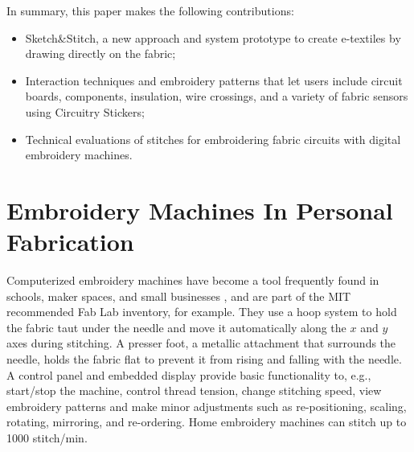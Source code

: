 \documentclass[header.tex]{subfiles}
\begin{document}
In summary, this paper makes the following contributions:
\begin{itemize}
    \item Sketch\&Stitch, a new approach and system prototype to create e-textiles by drawing directly on the fabric;
    \item Interaction techniques and  embroidery patterns that let users include circuit boards, components, insulation, wire crossings, and a variety of fabric sensors using Circuitry Stickers;
    \item Technical evaluations of stitches for embroidering fabric circuits with digital embroidery machines.
\end{itemize}








\section{Embroidery Machines In Personal Fabrication}
Computerized embroidery machines have become a tool frequently found in schools, maker spaces, and small businesses \cite{lipson2010factory}, and are part of the MIT recommended Fab Lab inventory, for example.  %
They use a hoop system to hold the fabric taut under the needle and move it automatically along the $x$ and $y$ axes during stitching. %
A presser foot, a metallic attachment that surrounds the needle, holds the fabric flat to prevent it from rising and falling with the needle. A control panel and embedded display provide basic functionality to, e.g., start/stop the machine, control thread tension, change stitching speed, view embroidery patterns and make minor adjustments such as re-positioning, scaling, rotating, mirroring, and re-ordering. Home embroidery machines can stitch up to 1000 stitch/min.


\end{document}

